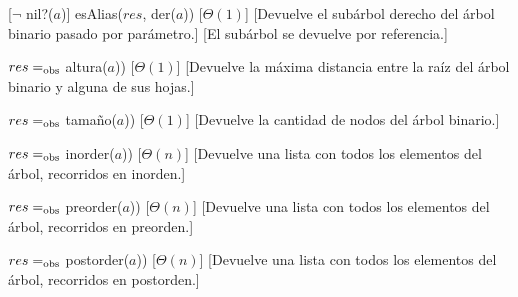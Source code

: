 \begin{Interfaz}
    [$\neg$ nil?($a$)]
    {esAlias($res$, der($a$))}
    [$\Theta(1)$]
    [Devuelve el sub\'arbol derecho del \'arbol binario pasado por par\'ametro.]
    [El sub\'arbol se devuelve por referencia.]

    {$res =_{\mathrm{obs}}$ altura($a$))}
    [$\Theta(1)$]
    [Devuelve la m\'axima distancia entre la ra\'iz del \'arbol binario y alguna de sus hojas.]

    {$res =_{\mathrm{obs}}$ tama\~no($a$))}
    [$\Theta(1)$]
    [Devuelve la cantidad de nodos del \'arbol binario.]

    {$res =_{\mathrm{obs}}$ inorder($a$))}
    [$\Theta(n)$]
    [Devuelve una lista con todos los elementos del \'arbol, recorridos en inorden.]

    {$res =_{\mathrm{obs}}$ preorder($a$))}
    [$\Theta(n)$]
    [Devuelve una lista con todos los elementos del \'arbol, recorridos en preorden.]

    {$res =_{\mathrm{obs}}$ postorder($a$))}
    [$\Theta(n)$]
    [Devuelve una lista con todos los elementos del \'arbol, recorridos en postorden.]

\end{Interfaz}

